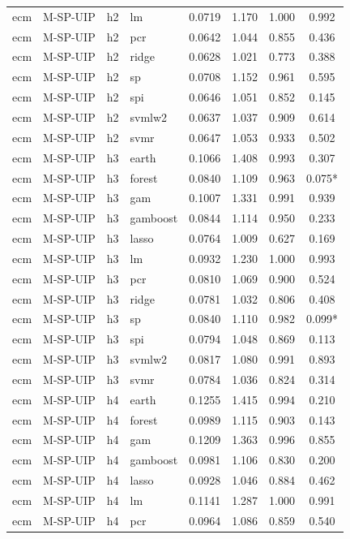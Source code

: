\begin{ThreePartTable}
\begin{longtable}[t]{llclcccc}
ecm & M-SP-UIP & h2 & lm & 0.0719 & 1.170 & 1.000 & 0.992\\
ecm & M-SP-UIP & h2 & pcr & 0.0642 & 1.044 & 0.855 & 0.436\\
ecm & M-SP-UIP & h2 & ridge & 0.0628 & 1.021 & 0.773 & 0.388\\
ecm & M-SP-UIP & h2 & sp & 0.0708 & 1.152 & 0.961 & 0.595\\
ecm & M-SP-UIP & h2 & spi & 0.0646 & 1.051 & 0.852 & 0.145\\
ecm & M-SP-UIP & h2 & svmlw2 & 0.0637 & 1.037 & 0.909 & 0.614\\
ecm & M-SP-UIP & h2 & svmr & 0.0647 & 1.053 & 0.933 & 0.502\\
\addlinespace
ecm & M-SP-UIP & h3 & earth & 0.1066 & 1.408 & 0.993 & 0.307\\
ecm & M-SP-UIP & h3 & forest & 0.0840 & 1.109 & 0.963 & 0.075*\\
ecm & M-SP-UIP & h3 & gam & 0.1007 & 1.331 & 0.991 & 0.939\\
ecm & M-SP-UIP & h3 & gamboost & 0.0844 & 1.114 & 0.950 & 0.233\\
ecm & M-SP-UIP & h3 & lasso & 0.0764 & 1.009 & 0.627 & 0.169\\
ecm & M-SP-UIP & h3 & lm & 0.0932 & 1.230 & 1.000 & 0.993\\
ecm & M-SP-UIP & h3 & pcr & 0.0810 & 1.069 & 0.900 & 0.524\\
ecm & M-SP-UIP & h3 & ridge & 0.0781 & 1.032 & 0.806 & 0.408\\
ecm & M-SP-UIP & h3 & sp & 0.0840 & 1.110 & 0.982 & 0.099*\\
ecm & M-SP-UIP & h3 & spi & 0.0794 & 1.048 & 0.869 & 0.113\\
ecm & M-SP-UIP & h3 & svmlw2 & 0.0817 & 1.080 & 0.991 & 0.893\\
ecm & M-SP-UIP & h3 & svmr & 0.0784 & 1.036 & 0.824 & 0.314\\
\addlinespace
ecm & M-SP-UIP & h4 & earth & 0.1255 & 1.415 & 0.994 & 0.210\\
ecm & M-SP-UIP & h4 & forest & 0.0989 & 1.115 & 0.903 & 0.143\\
ecm & M-SP-UIP & h4 & gam & 0.1209 & 1.363 & 0.996 & 0.855\\
ecm & M-SP-UIP & h4 & gamboost & 0.0981 & 1.106 & 0.830 & 0.200\\
ecm & M-SP-UIP & h4 & lasso & 0.0928 & 1.046 & 0.884 & 0.462\\
ecm & M-SP-UIP & h4 & lm & 0.1141 & 1.287 & 1.000 & 0.991\\
ecm & M-SP-UIP & h4 & pcr & 0.0964 & 1.086 & 0.859 & 0.540\\

\end{longtable}
\end{ThreePartTable}
